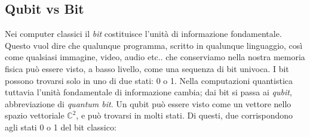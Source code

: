 \documentclass{book}
\theoremstyle{definition}
\theoremstyle{definition}
\theoremstyle{definition}
\theoremstyle{plain}
\theoremstyle{plain}
\theoremstyle{plain}
\theoremstyle{plain}
\begin{document}
\subsection{Qubit vs Bit}
Nei computer classici il \emph{bit} costituisce l'unità di informazione fondamentale. Questo vuol dire che qualunque programma, scritto in qualunque linguaggio, così come qualsiasi immagine, video, audio etc.. che conserviamo nella nostra memoria fisica può essere visto, a basso livello, come una sequenza di bit univoca. I bit possono trovarsi solo in uno di due stati: 0 o 1. %
Nella computazioni quantistica tuttavia l'unità fondamentale di informazione cambia; dai bit si passa ai \emph{qubit}, abbreviazione di \emph{quantum bit}. Un qubit può essere visto come un vettore nello spazio vettoriale $\mathbb{C}^{2}$, e può trovarsi in molti stati. Di questi, due corrispondono agli stati 0 o 1 del bit classico:
\end{document}

